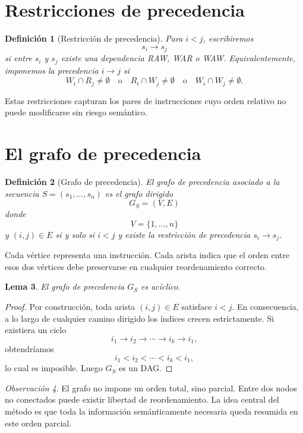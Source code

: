\documentclass[letterpaper,oneside]{article}
\newtheorem{definition}{Definición}[section]
\newtheorem{lemma}[definition]{Lema}
\theoremstyle{remark}
\newtheorem{remark}[definition]{Observación}
\newcommand{\reads}[1]{R_{#1}}
\newcommand{\writes}[1]{W_{#1}}
\begin{document}
\section{Restricciones de precedencia}

\begin{definition}[Restricción de precedencia]
Para $i<j$, escribiremos
\[
  s_i \to s_j
\]
si entre $s_i$ y $s_j$ existe una dependencia RAW, WAR o WAW. Equivalentemente, imponemos la precedencia $i \to j$ si
\[
  \writes{i} \cap \reads{j} \neq \emptyset
  \quad\text{o}\quad
  \reads{i} \cap \writes{j} \neq \emptyset
  \quad\text{o}\quad
  \writes{i} \cap \writes{j} \neq \emptyset.
\]
\end{definition}

Estas restricciones capturan los pares de instrucciones cuyo orden relativo no puede modificarse sin riesgo semántico.

\section{El grafo de precedencia}

\begin{definition}[Grafo de precedencia]
El \emph{grafo de precedencia} asociado a la secuencia $S=(s_1,\dots,s_n)$ es el grafo dirigido
\[
  G_S = (V,E)
\]
donde
\[
  V = \{1,\dots,n\}
\]
y $ (i,j) \in E $ si y solo si $i<j$ y existe la restricción de precedencia $s_i \to s_j$.
\end{definition}

Cada vértice representa una instrucción. Cada arista indica que el orden entre esos dos vértices debe preservarse en cualquier reordenamiento correcto.

\begin{lemma}
El grafo de precedencia $G_S$ es acíclico.
\end{lemma}

\begin{proof}
Por construcción, toda arista $(i,j) \in E$ satisface $i<j$. En consecuencia, a lo largo de cualquier camino dirigido los índices crecen estrictamente. Si existiera un ciclo
\[
  i_1 \to i_2 \to \cdots \to i_k \to i_1,
\]
obtendríamos
\[
  i_1 < i_2 < \cdots < i_k < i_1,
\]
lo cual es imposible. Luego $G_S$ es un DAG.
\end{proof}

\begin{remark}
El grafo no impone un orden total, sino parcial. Entre dos nodos no conectados puede existir libertad de reordenamiento. La idea central del método es que toda la información semánticamente necesaria queda resumida en este orden parcial.
\end{remark}
\end{document}
